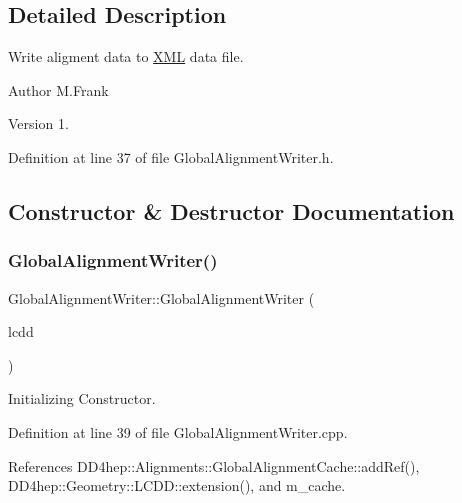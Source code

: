 \subsection{Detailed Description}
Write aligment data to \hyperlink{namespace_d_d4hep_1_1_x_m_l}{X\+ML} data file. 

\begin{DoxyAuthor}{Author}
M.\+Frank 
\end{DoxyAuthor}
\begin{DoxyVersion}{Version}
1. 
\end{DoxyVersion}


Definition at line 37 of file Global\+Alignment\+Writer.\+h.



\subsection{Constructor \& Destructor Documentation}
\hypertarget{class_d_d4hep_1_1_alignments_1_1_global_alignment_writer_a11a20b65cc5391ee6b6f77cb38fb5703}{}\label{class_d_d4hep_1_1_alignments_1_1_global_alignment_writer_a11a20b65cc5391ee6b6f77cb38fb5703} 
\subsubsection{\texorpdfstring{Global\+Alignment\+Writer()}{GlobalAlignmentWriter()}}
{\footnotesize\ttfamily Global\+Alignment\+Writer\+::\+Global\+Alignment\+Writer (\begin{DoxyParamCaption}\item[{\hyperlink{class_d_d4hep_1_1_geometry_1_1_l_c_d_d}{L\+C\+DD} \&}]{lcdd }\end{DoxyParamCaption})}



Initializing Constructor. 



Definition at line 39 of file Global\+Alignment\+Writer.\+cpp.



References D\+D4hep\+::\+Alignments\+::\+Global\+Alignment\+Cache\+::add\+Ref(), D\+D4hep\+::\+Geometry\+::\+L\+C\+D\+D\+::extension(), and m\+\_\+cache.

